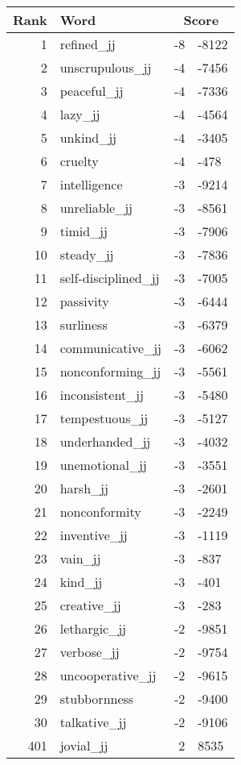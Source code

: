 \begin{longtable}[!htbp]{| rlr@{.}l |}
    \hline
    \textbf{Rank} & \textbf{Word} & \multicolumn{2}{c|}{\textbf{Score}} \\
    \hline
    \endhead
    1 & refined\_jj & -8 & -8122 \\
    2 & unscrupulous\_jj & -4 & -7456 \\
    3 & peaceful\_jj & -4 & -7336 \\
    4 & lazy\_jj & -4 & -4564 \\
    5 & unkind\_jj & -4 & -3405 \\
    6 & cruelty & -4 & -478 \\
    7 & intelligence & -3 & -9214 \\
    8 & unreliable\_jj & -3 & -8561 \\
    9 & timid\_jj & -3 & -7906 \\
    10 & steady\_jj & -3 & -7836 \\
    11 & self-disciplined\_jj & -3 & -7005 \\
    12 & passivity & -3 & -6444 \\
    13 & surliness & -3 & -6379 \\
    14 & communicative\_jj & -3 & -6062 \\
    15 & nonconforming\_jj & -3 & -5561 \\
    16 & inconsistent\_jj & -3 & -5480 \\
    17 & tempestuous\_jj & -3 & -5127 \\
    18 & underhanded\_jj & -3 & -4032 \\
    19 & unemotional\_jj & -3 & -3551 \\
    20 & harsh\_jj & -3 & -2601 \\
    21 & nonconformity & -3 & -2249 \\
    22 & inventive\_jj & -3 & -1119 \\
    23 & vain\_jj & -3 & -837 \\
    24 & kind\_jj & -3 & -401 \\
    25 & creative\_jj & -3 & -283 \\
    26 & lethargic\_jj & -2 & -9851 \\
    27 & verbose\_jj & -2 & -9754 \\
    28 & uncooperative\_jj & -2 & -9615 \\
    29 & stubbornness & -2 & -9400 \\
    30 & talkative\_jj & -2 & -9106 \\
    401 & jovial\_jj & 2 & 8535 \\

\end{longtable}

